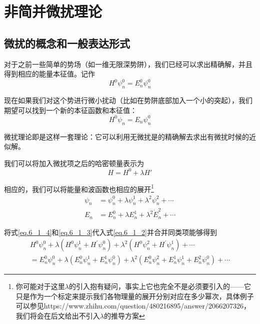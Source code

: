 \section{非简并微扰理论}
    \subsection{微扰的概念和一般表达形式}
        对于之前一些简单的势场（如一维无限深势阱），我们已经可以求出精确解，并且得到相应的能量本征值。记作
            \begin{equation}
                H^0 \psi_n^0 =E_n^0 \psi_n^0
            \end{equation}

        现在如果我们对这个势进行微小扰动（比如在势阱底部加入一个小的突起），我们期望可以找到一个新的本征函数和本征值：
            \begin{equation}
                \label{eq.6_1_2}
                H^0 \psi_n =E_n \psi_n^0
            \end{equation}

        微扰理论即是这样一套理论：它可以利用无微扰是的精确解去求出有微扰时候的近似解。

        我们可以将加入微扰项之后的哈密顿量表示为
            \begin{equation}
                \label{eq.6_1_3}
                H = H^0 + \lambda H'
            \end{equation}

        相应的，我们可以将能量和波函数也相应的展开\footnote{你可能对于这里$\lambda$的引入抱有疑问，事实上它也完全不是必须要引入的——它只是作为一个标定来提示我们各物理量的展开分别对应在多少幂次，具体例子可以参见https://www.zhihu.com/question/480216895/answer/2066207326，我们将会在后文给出不引入$\lambda$的推导方案}
        \begin{equation}
            \label{eq.6_1_4}
            \begin{aligned}
            \psi_{n} &=\psi_{n}^{0}+\lambda \psi_{n}^{1}+\lambda^{2} \psi_{n}^{2}+\cdots \\
            E_{n} &=E_{n}^{0}+\lambda E_{n}^{1}+\lambda^{2} \dot{E}_{n}^{2}+\cdots
            \end{aligned}
        \end{equation}
        
        将式\ref{eq.6_1_4}和\ref{eq.6_1_3}代入式\ref{eq.6_1_2}并合并同类项能够得到
        \begin{equation}    
            \label{eq.6_1_5}
            \begin{gathered}
            H^{0} \psi_{n}^{0}+\lambda\left(H^{0} \psi_{n}^{1}+H^{\prime} \psi_{n}^{0}\right)+\lambda^{2}\left(H^{0} \psi_{n}^{2}+H^{\prime} \psi_{n}^{1}\right)+\cdots \\
            =E_{n}^{0} \psi_{n}^{0}+\lambda\left(E_{n}^{0} \psi_{n}^{1}+E_{n}^{1} \psi_{n}^{0}\right)+\lambda^{2}\left(E_{n}^{0} \psi_{n}^{2}+E_{n}^{1} \psi_{n}^{1}+E_{n}^{2} \psi_{n}^{0}\right)+\cdots
            \end{gathered}
        \end{equation}


